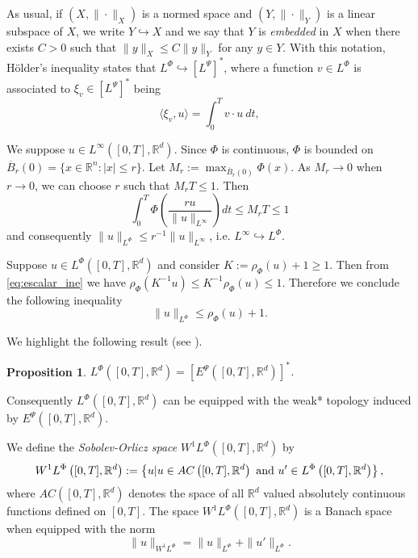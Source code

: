 \documentclass[twoside]{article}
\newtheorem{prop}[thm]{Proposition}
\theoremstyle{remark}
\newcommand{\orlnor}{\|_{L^{\Phi}}}
\newcommand{\linf}{\|_{L^{\infty}}}
\newcommand{\lphi}{L^{\Phi}}
\newcommand{\lpsi}{L^{\Psi}}
\newcommand{\wphi}{W^{1}\lphi}
\newcommand{\rr}{\mathbb{R}}
\renewcommand{\leq}{\leqslant}
\renewcommand{\geq}{\geqslant}
\newcommand{\epsi}{E^{\Psi}}
\begin{document}
As usual, if $(X,\|\cdot\|_X)$ is a normed space and $(Y,\|\cdot \|_Y)$ is a linear subspace of $X$,  we write $Y\hookrightarrow X$ and we say that $Y$ is \emph{embedded} in $X$  when there exists $C>0$ such that
$\|y\|_X\leq C\|y\|_Y$ for any $y\in Y$.  With this notation, H\"older's inequality states that  $\lphi\hookrightarrow  \left[\lpsi\right]^*$, where a function $v\in\lphi$ is associated  to $\xi_v\in \left[\lpsi\right]^*$ being
\begin{equation}\label{pairing}
  \langle \xi_v,u\rangle=\int_0^Tv\cdot u\ dt,
\end{equation}


We suppose $u\in L^{\infty}([0,T],\rr^d)$. Since $\Phi$ is continuous, $\Phi$ is bounded on $\overline{B}_r(0)=\{x\in \rr^n:|x|\leq r\}$. Let $M_r:=\max_{\overline{B}_r(0)} \Phi(x)$. As $M_r\to 0$ when $r\to 0$, we can choose $r$ such that $M_rT\leq 1$. Then
\[\int_0^T \Phi\left(\frac{ru}{\|u\linf}\right)dt\leq M_rT\leq 1\]
and consequently
$\|u\orlnor \leq r^{-1}\|u\linf$, i.e. $L^{\infty} \hookrightarrow L^\Phi$.

Suppose $u\in\lphi([0,T],\rr^d)$ and consider $K:=\rho_{\Phi}(u)+1\geq 1$. Then from \eqref{eq:escalar_ine} we have $\rho_{\Phi}(K^{-1}u)\leq K^{-1}\rho_{\Phi}(u)\leq 1$. Therefore we conclude the following inequality
\begin{equation}\label{eq:amemiya}
 \|u\orlnor \leq \rho_{\Phi}(u)+1.
\end{equation}



We highlight the following result (see \cite[Th. 3.3]{gwiazda2013anisotropic}).

\begin{prop} $\lphi\left([0,T],\rr^d\right)=\left[\epsi\left([0,T],\rr^d\right)\right]^*$.
 
\end{prop}

Consequently  $\lphi\left([0,T],\rr^d\right)$ can be equipped with the weak* topology induced by $\epsi\left([0,T],\rr^d\right)$.






We define the \emph{Sobolev-Orlicz space} $\wphi\left([0,T],\rr^d\right)$ by
\[\wphi\left([0,T],\rr^d\right):=\left\{u| u\in AC\left([0,T],\rr^d\right) \hbox{ and } u'\in \lphi\left([0,T],\rr^d\right)\right\},\]
where $AC\left([0,T],\rr^d\right)$ denotes the space of all $\rr^d$ valued absolutely continuous functions defined on $[0,T]$. The space $\wphi\left([0,T],\rr^d\right)$ is a Banach space when equipped with the norm
\begin{equation}\label{def-norma-orlicz-sob}
\|  u  \|_{\wphi}= \|  u  \|_{\lphi} + \|u'\orlnor.
\end{equation}
\end{document}
